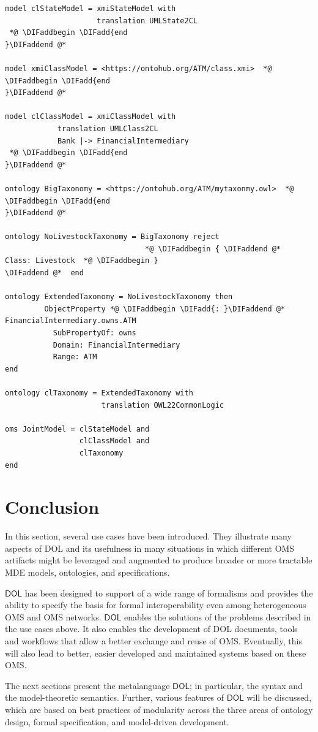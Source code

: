 \documentclass[10pt,fleqn,final]{scrreprt}
\newcommand*{\DOL}{\ensuremath{\mathsf{DOL}}\xspace}
\newenvironment{definitions}[0]{\medskip }{}
\providecommand{\DIFadd}[1]{{\protect\color{blue}\uwave{#1}}} %
\providecommand{\DIFaddbegin}{} %
\providecommand{\DIFaddend}{} %
\begin{document}
\begin{definitions}
\begin{lstlisting}[basicstyle=\ttfamily\small,language=dolText,alsolanguage=owl2Manchester,escapechar=@,mathescape]
model clStateModel = xmiStateModel with
                     translation UMLState2CL
 *@ \DIFaddbegin \DIFadd{end
}\DIFaddend @*  

model xmiClassModel = <https://ontohub.org/ATM/class.xmi>  *@ \DIFaddbegin \DIFadd{end
}\DIFaddend @*  

model clClassModel = xmiClassModel with
            translation UMLClass2CL
            Bank |-> FinancialIntermediary
 *@ \DIFaddbegin \DIFadd{end
}\DIFaddend @*  

ontology BigTaxonomy = <https://ontohub.org/ATM/mytaxonmy.owl>  *@ \DIFaddbegin \DIFadd{end
}\DIFaddend @*  

ontology NoLivestockTaxonomy = BigTaxonomy reject
                                *@ \DIFaddbegin { \DIFaddend @*  Class: Livestock  *@ \DIFaddbegin }
\DIFaddend @*  end

ontology ExtendedTaxonomy = NoLivestockTaxonomy then
         ObjectProperty *@ \DIFaddbegin \DIFadd{: }\DIFaddend @*  FinancialIntermediary.owns.ATM
           SubPropertyOf: owns
           Domain: FinancialIntermediary
           Range: ATM
end

ontology clTaxonomy = ExtendedTaxonomy with
                      translation OWL22CommonLogic

oms JointModel = clStateModel and
                 clClassModel and
                 clTaxonomy
end
\end{lstlisting}

\section{Conclusion}

In this section, several use cases have been introduced. They illustrate many aspects of DOL and its usefulness in many situations in which different OMS artifacts might be leveraged and augmented to produce broader or more tractable MDE models, ontologies, and specifications.

 \DOL has been designed to support of a wide range of formalisms and
provides the ability to specify the basis for formal interoperability even among heterogeneous OMS and OMS networks. \DOL enables the solutions of the problems described in the use cases above. It also enables the development of DOL documents, tools and workflows that 
allow  a better exchange and reuse of OMS. Eventually, this will also lead to better, easier developed and maintained systems based on these OMS.

The next sections present the metalanguage \DOL{}; in particular, the syntax and the model-theoretic semantics. Further, various features of \DOL will be discussed, which  are based on  best practices of modularity  across
 the three areas of ontology design, formal 
specification, and model-driven development.





\end{definitions}
\end{document}
